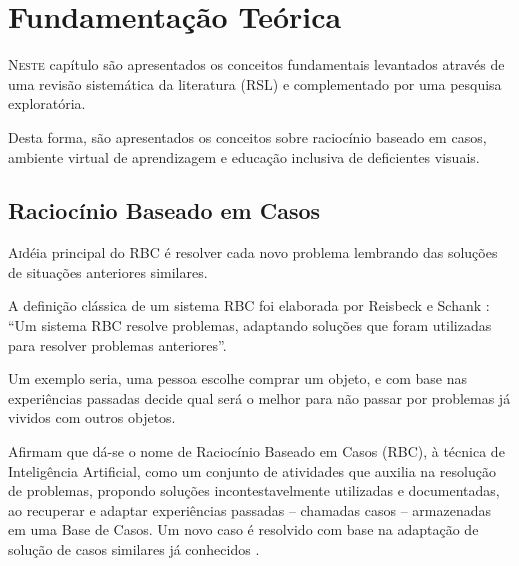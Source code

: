 \chapter{Fundamentação Teórica} \label{chap:Fundamentação}
\lettrine{N}{este} capítulo são apresentados os conceitos fundamentais levantados através de uma revisão sistemática da literatura (RSL) e complementado por uma pesquisa exploratória. 

Desta forma, são apresentados os conceitos sobre raciocínio baseado em casos, ambiente virtual de aprendizagem e educação inclusiva de deficientes visuais.

\section{Raciocínio Baseado em Casos}
\lettrine{A} idéia principal do RBC é resolver cada novo problema lembrando das soluções de situações anteriores similares.

A definição clássica de um sistema RBC foi elaborada por Reisbeck e Schank \cite{Riesbeck}: “Um sistema RBC resolve problemas, adaptando soluções que foram utilizadas para resolver problemas anteriores”.

Um exemplo seria, uma pessoa escolhe comprar um objeto, e com base nas experiências
passadas decide qual será o melhor para não passar por problemas já vividos com outros
objetos.

\cite{WANGENHEIM2013} Afirmam que dá-se o nome de Raciocínio Baseado em Casos (RBC), à técnica de Inteligência Artificial, como um conjunto de atividades que auxilia na resolução de problemas, propondo soluções incontestavelmente utilizadas e documentadas, ao recuperar e adaptar experiências passadas – chamadas casos – armazenadas em uma Base de Casos. Um novo caso é resolvido com base na adaptação de solução de casos similares já conhecidos \cite{WANGENHEIM2013}.

